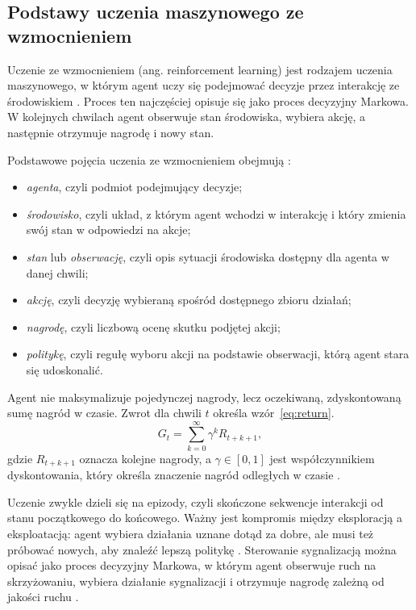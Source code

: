 \subsection{Podstawy uczenia maszynowego ze wzmocnieniem}
\label{subsec:rl-podstawy}

Uczenie ze wzmocnieniem (ang. reinforcement learning) jest rodzajem uczenia maszynowego, w którym agent uczy się podejmować decyzje przez interakcję ze środowiskiem \cite{sutton2018reinforcement}. Proces ten najczęściej opisuje się jako proces decyzyjny Markowa. W kolejnych chwilach agent obserwuje stan środowiska, wybiera akcję, a następnie otrzymuje nagrodę i nowy stan.

Podstawowe pojęcia uczenia ze wzmocnieniem obejmują \cite{sutton2018reinforcement}:
\begin{itemize}
    \item \emph{agenta}, czyli podmiot podejmujący decyzje;
    \item \emph{środowisko}, czyli układ, z którym agent wchodzi w interakcję i który zmienia swój stan w odpowiedzi na akcje;
    \item \emph{stan} lub \emph{obserwację}, czyli opis sytuacji środowiska dostępny dla agenta w danej chwili;
    \item \emph{akcję}, czyli decyzję wybieraną spośród dostępnego zbioru działań;
    \item \emph{nagrodę}, czyli liczbową ocenę skutku podjętej akcji;
    \item \emph{politykę}, czyli regułę wyboru akcji na podstawie obserwacji, którą agent stara się udoskonalić.
\end{itemize}

Agent nie maksymalizuje pojedynczej nagrody, lecz oczekiwaną, zdyskontowaną sumę nagród w czasie. Zwrot dla chwili $t$ określa wzór~\ref{eq:return}.
\begin{equation}
    G_t = \sum_{k=0}^{\infty} \gamma^{k} R_{t+k+1},
    \label{eq:return}
\end{equation}
gdzie $R_{t+k+1}$ oznacza kolejne nagrody, a $\gamma \in [0,1]$ jest współczynnikiem dyskontowania, który określa znaczenie nagród odległych w czasie \cite{sutton2018reinforcement}.

Uczenie zwykle dzieli się na epizody, czyli skończone sekwencje interakcji od stanu początkowego do końcowego. Ważny jest kompromis między eksploracją a eksploatacją: agent wybiera działania uznane dotąd za dobre, ale musi też próbować nowych, aby znaleźć lepszą politykę \cite{sutton2018reinforcement}. Sterowanie sygnalizacją można opisać jako proces decyzyjny Markowa, w którym agent obserwuje ruch na skrzyżowaniu, wybiera działanie sygnalizacji i otrzymuje nagrodę zależną od jakości ruchu \cite{wei2019survey}.

